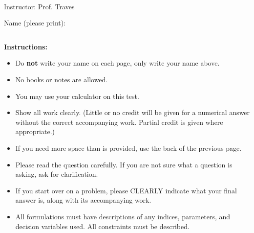 \documentclass[12pt]{article}
\begin{document}
 \pagestyle{empty}






\newpage


\noindent



 \\

\smskip

\noindent
{\sc Instructor: Prof. Traves}

\vspace{1.0cm}
\noindent
Name (please print): \ \ \rule{6cm}{.1mm}  \quad  
\vspace{1cm}


\noindent
{\bf Instructions:}
\\
\begin{itemize}
\item Do {\bf not} write your name on each page, only write your name above.

\item No books or notes %
 are allowed. %

\item You may use your calculator on this test.

\item Show all work clearly. (Little or no credit will be given for a numerical
answer without the correct accompanying work.
Partial credit is given where appropriate.) 

\item If you need more space than is provided, use the back of the previous page. 

\item Please read the question carefully.
If you are not sure what a question is
asking, ask for clarification.

\item If you start over on a problem, please CLEARLY indicate what your final
  answer is, along with its accompanying work.

\item All formulations must have descriptions of any indices, parameters, and decision variables used. All constraints must be described. 
\end{itemize}
\end{document}
